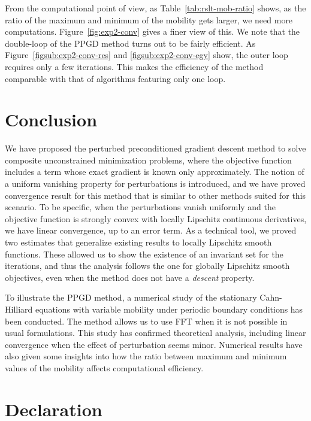 \documentclass{amsart}
\theoremstyle{definition}
\begin{document}
From the computational point of view, 
as Table~\ref{tab:rslt-mob-ratio} shows, as the ratio of the maximum and minimum of the mobility gets larger, we need more computations. Figure~\ref{fig:exp2-conv} gives a finer view of this.
We note that the double-loop of the PPGD method turns out to be fairly efficient. As Figure~\ref{figsub:exp2-conv-res} and \ref{figsub:exp2-conv-egy} show, the outer loop requires only a few iterations. This makes the efficiency of the method comparable with that of algorithms featuring only one loop. 


\section{Conclusion}

We have proposed the perturbed preconditioned gradient descent method to solve composite unconstrained minimization problems, where the objective function includes a term whose exact gradient is known only approximately. The notion of a uniform vanishing property for perturbations is introduced, and we have proved convergence result for this method that is similar to other methods suited for this scenario. To be specific, when the perturbations vanish uniformly and the objective function is strongly convex with locally Lipschitz continuous derivatives, we have linear convergence, up to an error term. As a technical tool, we proved two estimates that generalize existing results to locally Lipschitz smooth functions.
These allowed us to show the existence of an invariant set for the iterations, and thus the analysis follows the one for globally Lipschitz smooth objectives, even when the method does not have a \emph{descent} property.

To illustrate the PPGD method, a numerical study of the stationary Cahn-Hilliard equations with variable mobility under periodic boundary conditions has been conducted. The method allows us to use FFT when it is not possible in usual formulations. This study has confirmed theoretical analysis, including linear convergence when the effect of perturbation seems minor. Numerical results have also given some insights into how the ratio between maximum and minimum values of the mobility affects computational efficiency.


\section*{Declaration}
\end{document}

